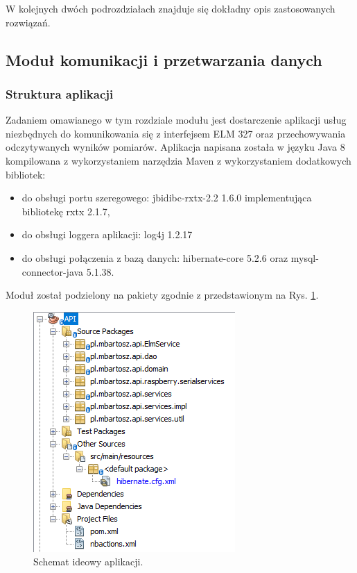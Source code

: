 \documentclass[12pt]{article} %
\numberwithin{equation}{subsection}
\numberwithin{figure}{section}
\numberwithin{table}{section}
\begin{document}
W kolejnych dwóch podrozdziałach znajduje się dokładny opis zastosowanych rozwiązań.

\newpage

	
\subsection{Moduł komunikacji i przetwarzania danych}\label{rozdzial_raspberry_software}
	\subsubsection{Struktura aplikacji}\label{rozdzial_pakiety_api}
	\hspace{0.5cm}Zadaniem omawianego w tym rozdziale modułu jest dostarczenie aplikacji usług niezbędnych do komunikowania się z interfejsem ELM 327 oraz przechowywania odczytywanych wyników pomiarów. Aplikacja napisana została w języku Java 8 kompilowana z wykorzystaniem narzędzia Maven z wykorzystaniem dodatkowych bibliotek:

	\begin{itemize}
		\item{do obsługi portu szeregowego: jbidibc-rxtx-2.2 1.6.0 implementująca bibliotekę rxtx 2.1.7,}
		\item{do obsługi loggera aplikacji: log4j 1.2.17}
		\item{do obsługi połączenia z bazą danych: hibernate-core 5.2.6 oraz mysql-connector-java 5.1.38.}
	\end{itemize}
	
	Moduł został podzielony na pakiety zgodnie z przedstawionym na Rys. \ref{rys_pakiety_api}.
	
		\begin{figure}[!h]
			\centering
			\includegraphics[scale=1]{Images/rys_pakiety_api.png}
			\caption{Schemat ideowy aplikacji.}
			\label{rys_pakiety_api}
		\end{figure}
		
\end{document}
